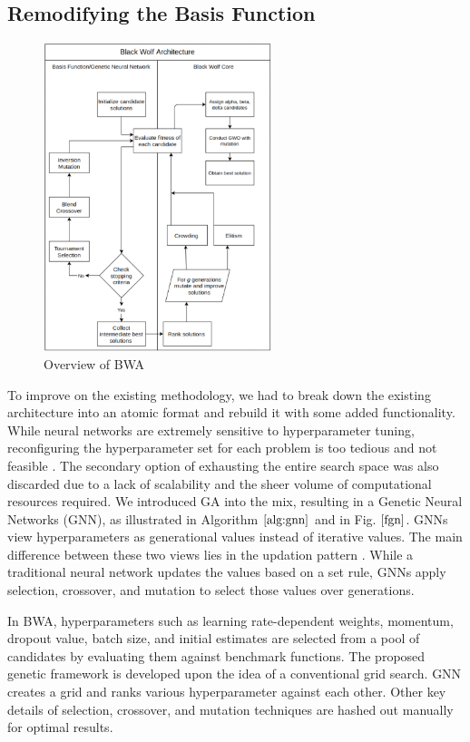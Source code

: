 \documentclass[conference]{IEEEtran}
\begin{document}
\subsection{Remodifying the Basis Function}

\begin{figure}
\centering\includegraphics[height=9cm]{flow.png}
\caption{Overview of BWA}
\label{flow}
\end{figure}
To improve on the existing methodology, we had to break down the existing architecture into an atomic format and rebuild it with some added functionality. While neural networks are extremely sensitive to hyperparameter tuning, reconfiguring the hyperparameter set for each problem is too tedious and not feasible \cite{mat}. The secondary option of exhausting the entire search space was also discarded due to a lack of scalability and the sheer volume of computational resources required. We introduced GA into the mix, resulting in a Genetic Neural Networks (GNN), as illustrated in Algorithm $\ref{alg:gnn}$ and in Fig. $\ref{fgn}$. GNNs view hyperparameters as generational values instead of iterative values. The main difference between these two views lies in the updation pattern \cite{gnn}. While a traditional neural network updates the values based on a set rule, GNNs apply selection, crossover, and mutation to select those values over generations. 

In BWA, hyperparameters such as learning rate-dependent weights, momentum, dropout value, batch size, and initial estimates are selected from a pool of candidates by evaluating them against benchmark functions. The proposed genetic framework is developed upon the idea of a conventional grid search. GNN creates a grid and ranks various hyperparameter against each other. Other key details of selection, crossover, and mutation techniques are hashed out manually for optimal results. 
\end{document}

